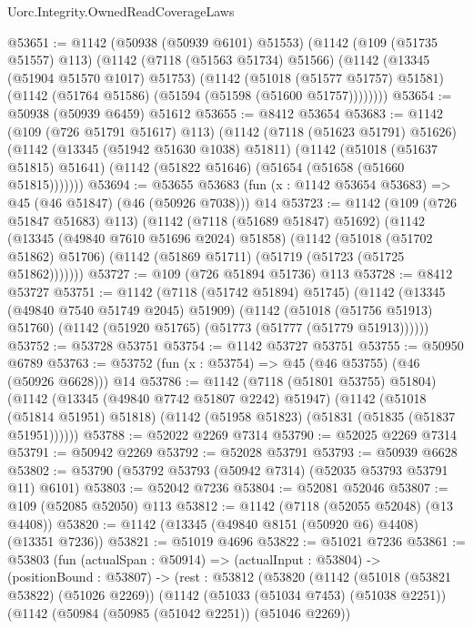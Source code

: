 \begin{lexlean}{Uorc.Integrity.OwnedReadCoverageLaws}
\begin{coremodule}
@53651 := @1142
    (@50938 (@50939 @6101) @51553)
    (@1142
      (@109 (@51735 @51557) @113)
      (@1142
        (@7118 (@51563 @51734) @51566)
        (@1142
          (@13345 (@51904 @51570 @1017) @51753)
          (@1142
            (@51018 (@51577 @51757) @51581)
            (@1142 (@51764 @51586) (@51594 (@51598 (@51600 @51757))))))))
@53654 := @50938 (@50939 @6459) @51612
@53655 := @8412 @53654
@53683 := @1142
    (@109 (@726 @51791 @51617) @113)
    (@1142
      (@7118 (@51623 @51791) @51626)
      (@1142
        (@13345 (@51942 @51630 @1038) @51811)
        (@1142
          (@51018 (@51637 @51815) @51641)
          (@1142 (@51822 @51646) (@51654 (@51658 (@51660 @51815)))))))
@53694 := @53655 @53683 (fun (x : @1142 @53654 @53683) => @45 (@46 @51847) (@46 (@50926 @7038))) @14
@53723 := @1142
    (@109 (@726 @51847 @51683) @113)
    (@1142
      (@7118 (@51689 @51847) @51692)
      (@1142
        (@13345 (@49840 @7610 @51696 @2024) @51858)
        (@1142
          (@51018 (@51702 @51862) @51706)
          (@1142 (@51869 @51711) (@51719 (@51723 (@51725 @51862)))))))
@53727 := @109 (@726 @51894 @51736) @113
@53728 := @8412 @53727
@53751 := @1142
    (@7118 (@51742 @51894) @51745)
    (@1142
      (@13345 (@49840 @7540 @51749 @2045) @51909)
      (@1142
        (@51018 (@51756 @51913) @51760)
        (@1142 (@51920 @51765) (@51773 (@51777 (@51779 @51913))))))
@53752 := @53728 @53751
@53754 := @1142 @53727 @53751
@53755 := @50950 @6789
@53763 := @53752 (fun (x : @53754) => @45 (@46 @53755) (@46 (@50926 @6628))) @14
@53786 := @1142
    (@7118 (@51801 @53755) @51804)
    (@1142
      (@13345 (@49840 @7742 @51807 @2242) @51947)
      (@1142
        (@51018 (@51814 @51951) @51818)
        (@1142 (@51958 @51823) (@51831 (@51835 (@51837 @51951))))))
@53788 := @52022 @2269 @7314
@53790 := @52025 @2269 @7314
@53791 := @50942 @2269
@53792 := @52028 @53791
@53793 := @50939 @6628
@53802 := @53790 (@53792 @53793 (@50942 @7314) (@52035 @53793 @53791 @11) @6101)
@53803 := @52042 @7236
@53804 := @52081 @52046
@53807 := @109 (@52085 @52050) @113
@53812 := @1142 (@7118 (@52055 @52048) (@13 @4408))
@53820 := @1142 (@13345 (@49840 @8151 (@50920 @6) @4408) (@13351 @7236))
@53821 := @51019 @4696
@53822 := @51021 @7236
@53861 := @53803
    (fun (actualSpan : @50914) =>
    (actualInput : @53804) ->
    (positionBound : @53807) ->
    (rest : @53812
      (@53820
        (@1142
          (@51018 (@53821 @53822) (@51026 @2269))
          (@1142
            (@51033 (@51034 @7453) (@51038 @2251))
            (@1142
              (@50984 (@50985 (@51042 @2251)) (@51046 @2269))

\end{coremodule}
\end{lexlean}
